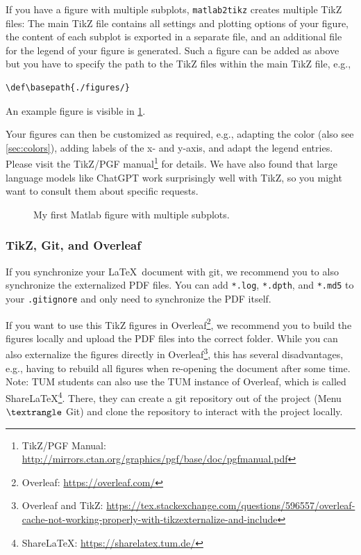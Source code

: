 \documentclass{article}
\begin{document}
If you have a figure with multiple subplots, \texttt{matlab2tikz} creates multiple TikZ files:
The main TikZ file contains all settings and plotting options of your figure,
the content of each subplot is exported in a separate file,
and an additional file for the legend of your figure is generated.
Such a figure can be added as above but you have to specify the path to the TikZ files within the main TikZ file, e.g.,
\begin{verbatim}
\def\basepath{./figures/}
\end{verbatim}
An example figure is visible in \cref{fig:mymatlabgroupfigure}.

Your figures can then be customized as required, e.g., adapting the color (also see \cref{sec:colors}), adding labels of the x- and y-axis, and adapt the legend entries.
Please visit the TikZ/PGF manual\footnote{TikZ/PGF Manual: \url{http://mirrors.ctan.org/graphics/pgf/base/doc/pgfmanual.pdf}} for details.
We have also found that large language models like ChatGPT work surprisingly well with TikZ,
so you might want to consult them about specific requests.

\begin{figure}[h!]
  \centering
  \caption{My first Matlab figure with multiple subplots.}
  \label{fig:mymatlabgroupfigure}
\end{figure}

\subsubsection{TikZ, Git, and Overleaf}
If you synchronize your \LaTeX\ document with git,
we recommend you to also synchronize the externalized PDF files.
You can add \texttt{*.log}, \texttt{*.dpth}, and \texttt{*.md5} to your \texttt{.gitignore} and only need to synchronize the PDF itself.

If you want to use this TikZ figures in Overleaf\footnote{Overleaf: \url{https://overleaf.com/}},
we recommend you to build the figures locally and upload the PDF files into the correct folder.
While you can also externalize the figures directly in Overleaf\footnote{Overleaf and TikZ: \url{https://tex.stackexchange.com/questions/596557/overleaf-cache-not-working-properly-with-tikzexternalize-and-include}},
this has several disadvantages, e.g., having to rebuild all figures when re-opening the document after some time.
Note: TUM students can also use the TUM instance of Overleaf, which is called ShareLaTeX\footnote{ShareLaTeX: \url{https://sharelatex.tum.de/}}.
There, they can create a git repository out of the project (Menu $\textrangle$ Git) and clone the repository to interact with the project locally.
\end{document}

